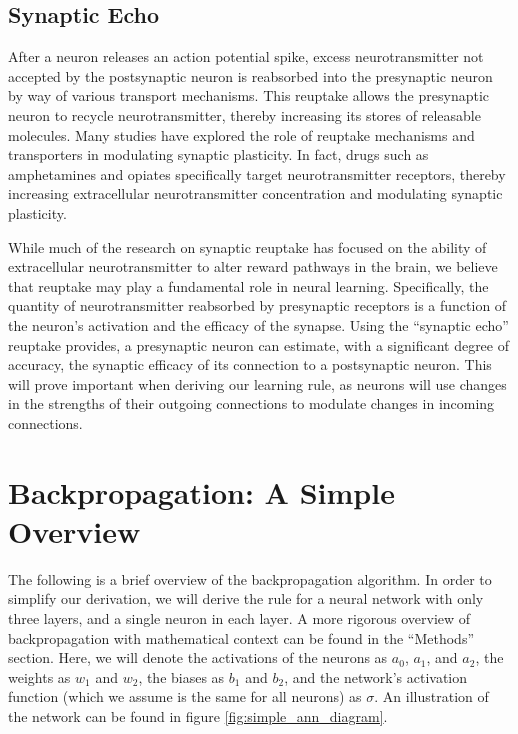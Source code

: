 \documentclass[12pt]{article}
\begin{document}
\subsection{Synaptic Echo}
After a neuron releases an action potential spike, excess neurotransmitter not accepted by the postsynaptic neuron is reabsorbed into the presynaptic neuron by way of various transport mechanisms. \cite{Rudnick1993} This reuptake allows the presynaptic neuron to recycle neurotransmitter, thereby increasing its stores of releasable molecules. \cite{Rudnick1993} Many studies have explored the role of reuptake mechanisms and transporters in modulating synaptic plasticity. \cite{Duman2016} In fact, drugs such as amphetamines and opiates specifically target neurotransmitter receptors, thereby increasing extracellular neurotransmitter concentration and modulating synaptic plasticity. \cite{Amara1998}

While much of the research on synaptic reuptake has focused on the ability of extracellular neurotransmitter to alter reward pathways in the brain, \cite{Koob1992} we believe that reuptake may play a fundamental role in neural learning. Specifically, the quantity of neurotransmitter reabsorbed by presynaptic receptors is a function of the neuron's activation and the efficacy of the synapse. Using the ``synaptic echo'' reuptake provides, a presynaptic neuron can estimate, with a significant degree of accuracy, the synaptic efficacy of its connection to a postsynaptic neuron. This will prove important when deriving our learning rule, as neurons will use changes in the strengths of their outgoing connections to modulate changes in incoming connections.

\section{Backpropagation: A Simple Overview}
The following is a brief overview of the backpropagation algorithm. In order to simplify our derivation, we will derive the rule for a neural network with only three layers, and a single neuron in each layer. A more rigorous overview of backpropagation with mathematical context can be found in the ``Methods'' section. Here, we will denote the activations of the neurons as $a_0$, $a_1$, and $a_2$, the weights as $w_1$ and $w_2$, the biases as $b_1$ and $b_2$, and the network's activation function (which we assume is the same for all neurons) as $\sigma$. An illustration of the network can be found in figure \ref{fig:simple_ann_diagram}.
\end{document}
